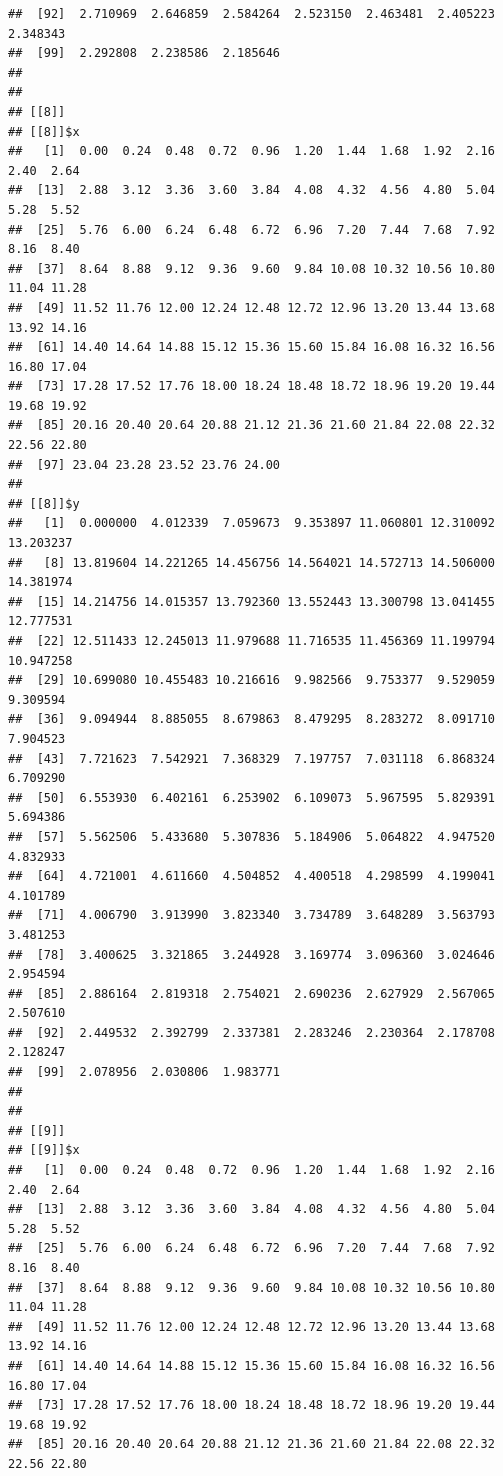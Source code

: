\documentclass[
  ignorenonframetext,
]{beamer}
\begin{document}
\begin{frame}[fragile]{}
\begin{verbatim}
##  [92]  2.710969  2.646859  2.584264  2.523150  2.463481  2.405223  2.348343
##  [99]  2.292808  2.238586  2.185646
## 
## 
## [[8]]
## [[8]]$x
##   [1]  0.00  0.24  0.48  0.72  0.96  1.20  1.44  1.68  1.92  2.16  2.40  2.64
##  [13]  2.88  3.12  3.36  3.60  3.84  4.08  4.32  4.56  4.80  5.04  5.28  5.52
##  [25]  5.76  6.00  6.24  6.48  6.72  6.96  7.20  7.44  7.68  7.92  8.16  8.40
##  [37]  8.64  8.88  9.12  9.36  9.60  9.84 10.08 10.32 10.56 10.80 11.04 11.28
##  [49] 11.52 11.76 12.00 12.24 12.48 12.72 12.96 13.20 13.44 13.68 13.92 14.16
##  [61] 14.40 14.64 14.88 15.12 15.36 15.60 15.84 16.08 16.32 16.56 16.80 17.04
##  [73] 17.28 17.52 17.76 18.00 18.24 18.48 18.72 18.96 19.20 19.44 19.68 19.92
##  [85] 20.16 20.40 20.64 20.88 21.12 21.36 21.60 21.84 22.08 22.32 22.56 22.80
##  [97] 23.04 23.28 23.52 23.76 24.00
## 
## [[8]]$y
##   [1]  0.000000  4.012339  7.059673  9.353897 11.060801 12.310092 13.203237
##   [8] 13.819604 14.221265 14.456756 14.564021 14.572713 14.506000 14.381974
##  [15] 14.214756 14.015357 13.792360 13.552443 13.300798 13.041455 12.777531
##  [22] 12.511433 12.245013 11.979688 11.716535 11.456369 11.199794 10.947258
##  [29] 10.699080 10.455483 10.216616  9.982566  9.753377  9.529059  9.309594
##  [36]  9.094944  8.885055  8.679863  8.479295  8.283272  8.091710  7.904523
##  [43]  7.721623  7.542921  7.368329  7.197757  7.031118  6.868324  6.709290
##  [50]  6.553930  6.402161  6.253902  6.109073  5.967595  5.829391  5.694386
##  [57]  5.562506  5.433680  5.307836  5.184906  5.064822  4.947520  4.832933
##  [64]  4.721001  4.611660  4.504852  4.400518  4.298599  4.199041  4.101789
##  [71]  4.006790  3.913990  3.823340  3.734789  3.648289  3.563793  3.481253
##  [78]  3.400625  3.321865  3.244928  3.169774  3.096360  3.024646  2.954594
##  [85]  2.886164  2.819318  2.754021  2.690236  2.627929  2.567065  2.507610
##  [92]  2.449532  2.392799  2.337381  2.283246  2.230364  2.178708  2.128247
##  [99]  2.078956  2.030806  1.983771
## 
## 
## [[9]]
## [[9]]$x
##   [1]  0.00  0.24  0.48  0.72  0.96  1.20  1.44  1.68  1.92  2.16  2.40  2.64
##  [13]  2.88  3.12  3.36  3.60  3.84  4.08  4.32  4.56  4.80  5.04  5.28  5.52
##  [25]  5.76  6.00  6.24  6.48  6.72  6.96  7.20  7.44  7.68  7.92  8.16  8.40
##  [37]  8.64  8.88  9.12  9.36  9.60  9.84 10.08 10.32 10.56 10.80 11.04 11.28
##  [49] 11.52 11.76 12.00 12.24 12.48 12.72 12.96 13.20 13.44 13.68 13.92 14.16
##  [61] 14.40 14.64 14.88 15.12 15.36 15.60 15.84 16.08 16.32 16.56 16.80 17.04
##  [73] 17.28 17.52 17.76 18.00 18.24 18.48 18.72 18.96 19.20 19.44 19.68 19.92
##  [85] 20.16 20.40 20.64 20.88 21.12 21.36 21.60 21.84 22.08 22.32 22.56 22.80

\end{verbatim}
\end{frame}
\end{document}
